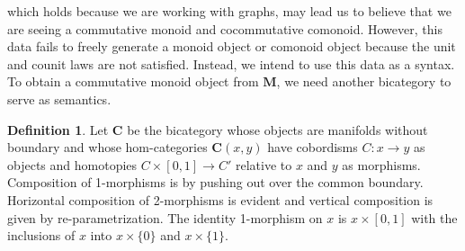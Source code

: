 \documentclass[11pt]{amsart}
\newcommand{\cat}[1]{\mathbf{#1}}
\newcommand{\from}{\colon}
\theoremstyle{remark}
\theoremstyle{definition}
\newtheorem{defn}[thm]{Definition}
\begin{document}
which holds because we are working with graphs,
may lead us to believe that
we are seeing a commutative 
monoid and cocommutative comonoid.  
However, this data fails to 
freely generate a monoid object or comonoid object because 
the unit and counit laws are not satisfied.
Instead, we intend to use 
this data as a syntax.   
To obtain a commutative monoid object
from $\cat{M}$,
we need another bicategory 
to serve as semantics. 

\begin{defn}
	Let $\cat{C}$ be the bicategory 
	whose objects are 
	manifolds without boundary and 
	whose hom-categories $\cat{C}(x,y)$ 
	have cobordisms $C \from x \to y$ as objects 
	and homotopies $C \times [0,1] \to C'$ 
	relative to $x$ and $y$ as morphisms. 
	Composition of 1-morphisms is by pushing
	out over the common boundary.  
	Horizontal composition of 2-morphisms 
	is evident and 
	vertical composition is given by
	re-parametrization.
	The identity 1-morphism on 
	$x$ is $x \times [0,1]$ with the 
	inclusions of $x$ into 
	$x \times \{ 0 \}$ and $x \times \{ 1 \}$.  
\end{defn}  
\end{document}
